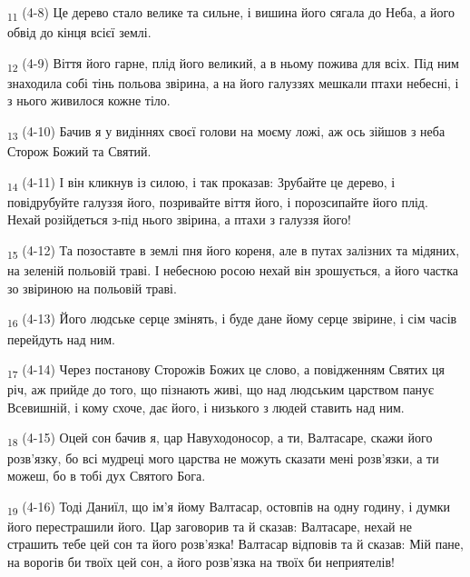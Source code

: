 \begin{tcolorbox}
\textsubscript{11} (4-8) Це дерево стало велике та сильне, і вишина його сягала до Неба, а його обвід до кінця всієї землі.
\end{tcolorbox}
\begin{tcolorbox}
\textsubscript{12} (4-9) Віття його гарне, плід його великий, а в ньому пожива для всіх. Під ним знаходила собі тінь польова звірина, а на його галуззях мешкали птахи небесні, і з нього живилося кожне тіло.
\end{tcolorbox}
\begin{tcolorbox}
\textsubscript{13} (4-10) Бачив я у видіннях своєї голови на моєму ложі, аж ось зійшов з неба Сторож Божий та Святий.
\end{tcolorbox}
\begin{tcolorbox}
\textsubscript{14} (4-11) І він кликнув із силою, і так проказав: Зрубайте це дерево, і повідрубуйте галуззя його, позривайте віття його, і порозсипайте його плід. Нехай розійдеться з-під нього звірина, а птахи з галуззя його!
\end{tcolorbox}
\begin{tcolorbox}
\textsubscript{15} (4-12) Та позоставте в землі пня його кореня, але в путах залізних та мідяних, на зеленій польовій траві. І небесною росою нехай він зрошується, а його частка зо звіриною на польовій траві.
\end{tcolorbox}
\begin{tcolorbox}
\textsubscript{16} (4-13) Його людське серце змінять, і буде дане йому серце звірине, і сім часів перейдуть над ним.
\end{tcolorbox}
\begin{tcolorbox}
\textsubscript{17} (4-14) Через постанову Сторожів Божих це слово, а повідженням Святих ця річ, аж прийде до того, що пізнають живі, що над людським царством панує Всевишній, і кому схоче, дає його, і низького з людей ставить над ним.
\end{tcolorbox}
\begin{tcolorbox}
\textsubscript{18} (4-15) Оцей сон бачив я, цар Навуходоносор, а ти, Валтасаре, скажи його розв'язку, бо всі мудреці мого царства не можуть сказати мені розв'язки, а ти можеш, бо в тобі дух Святого Бога.
\end{tcolorbox}
\begin{tcolorbox}
\textsubscript{19} (4-16) Тоді Даниїл, що ім'я йому Валтасар, остовпів на одну годину, і думки його перестрашили його. Цар заговорив та й сказав: Валтасаре, нехай не страшить тебе цей сон та його розв'язка! Валтасар відповів та й сказав: Мій пане, на ворогів би твоїх цей сон, а його розв'язка на твоїх би неприятелів!
\end{tcolorbox}
